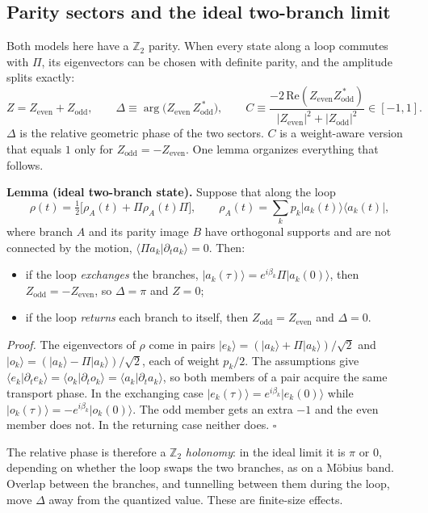\documentclass[11pt,a4paper]{article}
\newcommand{\ket}[1]{\lvert #1\rangle}
\newcommand{\bra}[1]{\langle #1\rvert}
\newcommand{\braket}[2]{\langle #1\vert #2\rangle}
\newcommand{\Zeven}{Z_{\mathrm{even}}}
\newcommand{\Zodd}{Z_{\mathrm{odd}}}
\begin{document}
\subsection{Parity sectors and the ideal two-branch limit}\label{sec:lemma}

Both models here have a $\mathbb Z_2$ parity. When every state along a loop commutes with $\Pi$,
its eigenvectors can be chosen with definite parity, and the amplitude splits exactly:
\begin{equation}
Z=\Zeven+\Zodd,\qquad
\Delta\equiv\arg\big(\Zeven\,\Zodd^{\,*}\big),\qquad
C\equiv\frac{-2\,\mathrm{Re}(\Zeven\Zodd^{\,*})}{|\Zeven|^2+|\Zodd|^2}\in[-1,1].
\label{eq:sectors}
\end{equation}
$\Delta$ is the relative geometric phase of the two sectors. $C$ is a weight-aware version that
equals $1$ only for $\Zodd=-\Zeven$. One lemma organizes everything that follows.

\medskip\noindent\textbf{Lemma (ideal two-branch state).}
Suppose that along the loop
\begin{equation}
\rho(t)=\tfrac12\big[\rho_A(t)+\Pi\rho_A(t)\Pi\big],
\qquad \rho_A(t)=\sum_k p_k\ket{a_k(t)}\bra{a_k(t)},
\end{equation}
where branch $A$ and its parity image $B$ have orthogonal supports and are not connected by the
motion, $\braket{\Pi a_k}{\partial_t a_k}=0$. Then:
\begin{itemize}
\item if the loop \emph{exchanges} the branches, $\ket{a_k(\tau)}=e^{i\beta_k}\Pi\ket{a_k(0)}$,
  then $\Zodd=-\Zeven$, so $\Delta=\pi$ and $Z=0$;
\item if the loop \emph{returns} each branch to itself, then $\Zodd=\Zeven$ and $\Delta=0$.
\end{itemize}

\noindent\emph{Proof.} The eigenvectors of $\rho$ come in pairs
$\ket{e_k}=(\ket{a_k}+\Pi\ket{a_k})/\sqrt2$ and $\ket{o_k}=(\ket{a_k}-\Pi\ket{a_k})/\sqrt2$, each
of weight $p_k/2$. The assumptions give
$\braket{e_k}{\partial_t e_k}=\braket{o_k}{\partial_t o_k}=\braket{a_k}{\partial_t a_k}$, so both
members of a pair acquire the same transport phase. In the exchanging case
$\ket{e_k(\tau)}=e^{i\beta_k}\ket{e_k(0)}$ while $\ket{o_k(\tau)}=-e^{i\beta_k}\ket{o_k(0)}$. The odd
member gets an extra $-1$ and the even member does not. In the returning case neither does.
$\square$

\medskip
The relative phase is therefore a $\mathbb Z_2$ \emph{holonomy}: in the ideal limit it is $\pi$
or $0$, depending on whether the loop swaps the two branches, as on a Möbius band. Overlap
between the branches, and tunnelling between them during the loop, move $\Delta$ away from the
quantized value. These are finite-size effects.
\end{document}
